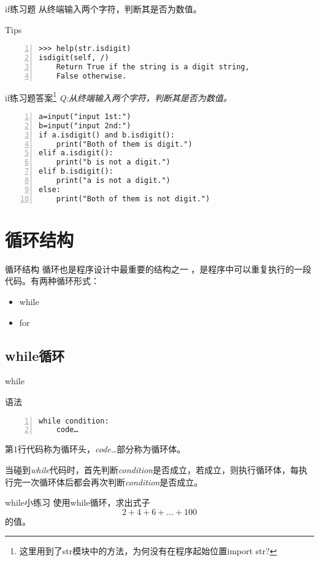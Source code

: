 \documentclass{beamer}
\begin{document}
\begin{frame}[fragile]{if练习题}
从终端输入两个字符，判断其是否为数值。
\begin{block}{Tips}
\begin{Verbatim}[numbers=left,frame=single,rulecolor=\color{red}]
>>> help(str.isdigit)
isdigit(self, /)
    Return True if the string is a digit string, 
    False otherwise.
\end{Verbatim}
\end{block}
\end{frame}
\begin{frame}[fragile]{if练习题答案\footnote{这里用到了str模块中的方法，为何没有在程序起始位置import str?}}
\textit{Q:从终端输入两个字符，判断其是否为数值。}
\begin{Verbatim}[numbers=left,frame=single,rulecolor=\color{red}]
a=input("input 1st:")
b=input("input 2nd:")
if a.isdigit() and b.isdigit():
    print("Both of them is digit.")
elif a.isdigit():
    print("b is not a digit.")
elif b.isdigit():
    print("a is not a digit.")
else:
    print("Both of them is not digit.")
\end{Verbatim}

\end{frame}

\section{循环结构}
\begin{frame}[fragile]{循环结构}
循环也是程序设计中最重要的结构之一
，是程序中可以重复执行的一段代码。有两种循环形式：
\begin{itemize}
\item while
\item for
\end{itemize}


\end{frame}
\subsection{while循环}

\begin{frame}[fragile]{while}
\begin{block}{语法}
\begin{Verbatim}[numbers=left,frame=single,rulecolor=\color{red}]
while condition:
    code…
\end{Verbatim}
\end{block}
第1行代码称为循环头，\textit{code…}部分称为循环体。

当碰到\textit{while}代码时，首先判断\textit{condition}是否成立，若成立，则执行循环体，每执行完一次循环体后都会再次判断\textit{condition}是否成立。
\end{frame}
\begin{frame}[fragile]{while小练习}
使用while循环，求出式子\begin{equation*}
2+4+6+…+100
\end{equation*}的值。
\end{frame}
\end{document}
